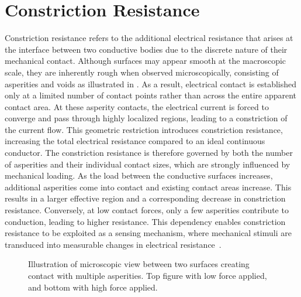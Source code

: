 \pagebreak
\section{Constriction Resistance} \label{sec:CR}
Constriction resistance refers to the additional electrical resistance that arises at the interface between two conductive bodies due to the discrete nature of their mechanical contact. Although surfaces may appear smooth at the macroscopic scale, they are inherently rough when observed microscopically, consisting of asperities and voids as illustrated in . 
As a result, electrical contact is established only at a limited number of contact points rather than across the entire apparent contact area.
At these asperity contacts, the electrical current is forced to converge and pass through highly localized regions, leading to a constriction of the current flow. This geometric restriction introduces constriction resistance, increasing the total electrical resistance compared to an ideal continuous conductor. The constriction resistance is therefore governed by both the number of asperities and their individual contact sizes, which are strongly influenced by mechanical loading. 
As the load between the conductive surfaces increases, additional asperities come into contact and existing contact areas increase. This results in a larger effective region and a corresponding decrease in constriction resistance. Conversely, at low contact forces, only a few asperities contribute to conduction, leading to higher resistance.
This dependency enables constriction resistance to be exploited as a sensing mechanism, where mechanical stimuli are transduced into measurable changes in electrical resistance~\cite{G.O.A.T}.

\begin{figure}[h]
\centering

    \caption{Illustration of microscopic view between two surfaces creating contact with multiple asperities. Top figure with low force applied, and bottom with high force applied.}
    \label{fig:CR}
\end{figure}